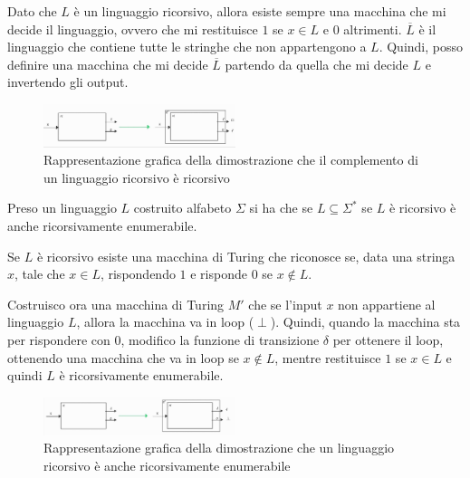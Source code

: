 \begin{dimostrazione}
    Dato che $L$ è un linguaggio ricorsivo, allora esiste sempre una macchina che
    mi decide il linguaggio, ovvero che mi restituisce $1$ se $x \in L$ e $0$
    altrimenti. $\overline{L}$ è il linguaggio che contiene tutte le stringhe
    che non appartengono a $L$. Quindi, posso definire una macchina che mi
    decide $\overline{L}$ partendo da quella che mi decide $L$ e invertendo gli
    output.
    \begin{figure}[!ht]
        \centering
        \includegraphics[width=0.5\textwidth]{img/MacchineTuring/dimostrazione1.png}
        \caption{Rappresentazione grafica della dimostrazione che il complemento
            di un linguaggio ricorsivo è ricorsivo}
    \end{figure}
\end{dimostrazione}
\begin{teorema}
    Preso un linguaggio $L$ costruito alfabeto $\Sigma$ si ha che se
    $L \subseteq \Sigma^{\ast}$ se $L$ è ricorsivo è anche ricorsivamente
    enumerabile.
\end{teorema}
\begin{dimostrazione}
    Se $L$ è ricorsivo esiste una macchina di Turing che riconosce se, data una
    stringa $x$, tale che $x \in L$, rispondendo $1$ e risponde $0$ se $x \not\in
        L$.
        
    Costruisco ora una macchina di Turing $M'$ che se l'input $x$ non appartiene
    al linguaggio $L$, allora la macchina va in loop ($\perp$). Quindi, quando
    la macchina sta per rispondere con $0$, modifico la funzione di transizione
    $\delta$ per ottenere il loop, ottenendo una macchina che va in loop se
    $x \not\in L$, mentre restituisce $1$ se $x \in L$ e quindi $L$ è ricorsivamente
    enumerabile.

    \begin{figure}[!ht]
        \centering
        \includegraphics[width=0.5\textwidth]{img/MacchineTuring/dimostrazione2.png}
        \caption{Rappresentazione grafica della dimostrazione che un linguaggio
            ricorsivo è anche ricorsivamente enumerabile}
    \end{figure}
\end{dimostrazione}
